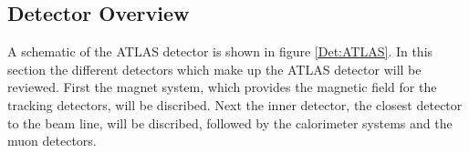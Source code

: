 \subsection{Detector Overview}
\label{sec:Det:Over}

A schematic of the ATLAS detector is shown in figure \ref{Det:ATLAS}. 
In this section the different detectors which make up the ATLAS detector will be reviewed. 
First the magnet system, which provides the magnetic field for the tracking detectors, will be discribed. 
Next the inner detector, the closest detector to the beam line, will be discribed, followed by the calorimeter systems and the muon detectors.

